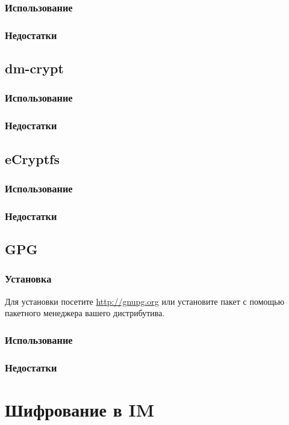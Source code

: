 \subsubsection{Использование}
\subsubsection{Недостатки}
\subsection{dm-crypt}
\subsubsection{Использование}
\subsubsection{Недостатки}
\subsection{eCryptfs}
\subsubsection{Использование}
\subsubsection{Недостатки}
\subsection{GPG}
\subsubsection{Установка}
Для установки посетите \url{http://gnupg.org} или установите пакет с помощью пакетного менеджера вашего дистрибутива.
\subsubsection{Использование}
\subsubsection{Недостатки}

\section{Шифрование в IM}
